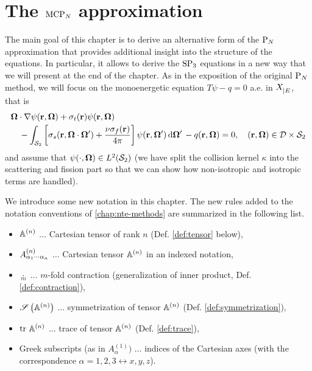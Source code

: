 \ifpdf
	\graphicspath{{4/pic/PNG/}{4/pic/PDF/}{4/pic/}}
\else
	\graphicspath{{4/pic/EPS/}{4/pic/}}
\fi

\chapter{The $\MCPN$ approximation}\label{chap:mcpn}

The main goal of this chapter is to derive an alternative form of the $\PN$ approximation that provides additional
insight into the structure of the equations. In particular, it allows to derive 
the $\SPN[3]$ equations in a new way that we will present at the end of the chapter. %
As in the exposition of the original $\PN$ method, we will focus on the monoenergetic equation $T\psi - q = 0$ a.e. in
$\XE$, that is
\begin{equation}\label{eq:MC-bte}
\begin{multlined}
    \bomega\cdot\nabla\psi(\br,\bomega) + \sigma_t(\br)\psi(\br,\bomega)\\ -
    \intA[']{\left[\sigma_s(\br,\bomega\cdot\bomega') + \frac{\nu\sigma_f(\br)}{4\pi}\right]\psi(\br,\bomega')} - q(\br,\bomega) = 0,\quad
    (\br,\bomega) \in \VV\times \Sphere  
\end{multlined}
\end{equation}
and assume that \mbox{$\psi(\cdot,\bomega)\in\Lp[2](\Sphere)$} (we have split the collision kernel $\kappa$ into the
scattering and fission part so that we can show how non-isotropic and isotropic terms are handled).

We introduce some new notation in this chapter. The new rules added to the notation conventions of
\cref{chap:nte-methods} are summarized in the following list.

\begin{itemize}
    \item $\AA$ $\ldots$ Cartesian tensor of rank $n$ (Def. \ref{def:tensor} below),
  	\item $\AAA{\alpha_1\cdots\alpha_n}$ $\ldots$ Cartesian tensor $\AA$ in an indexed notation,
    \item $\underset{m}{\cdot}$ $\ldots$ $m$-fold contraction (generalization of inner product, Def.
    \ref{def:contraction}),
    \item $\Sym{\AA}$ $\ldots$ symmetrization of tensor $\AA$ (Def. \ref{def:symmetrization}),
    \item $\trace \AA$ $\ldots$ trace of tensor $\AA$ (Def. \ref{def:trace}),
    \item Greek subscripts (as in $A^{(1)}_{\alpha})$ $\ldots$ indices of the Cartesian axes (with the
    correspondence $\alpha = 1,2,3 \leftrightarrow x,y,z$).
\end{itemize}

